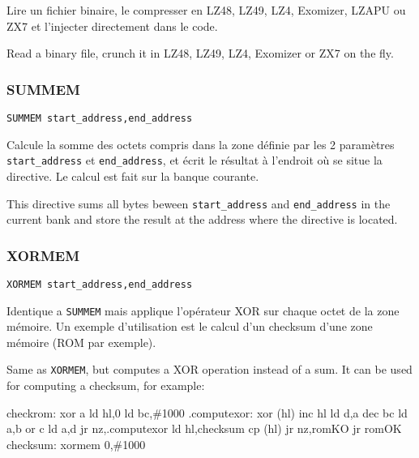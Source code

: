 \begin{xfr}
Lire un fichier binaire, le compresser en LZ48, LZ49, LZ4, Exomizer, LZAPU  ou ZX7 et l'injecter directement dans le code.
\end{xfr}

\begin{xen}
Read a binary file, crunch it in LZ48, LZ49, LZ4, Exomizer or ZX7 on the fly.
\end{xen}


\subsubsection{SUMMEM}
\begin{verbatim}
SUMMEM start_address,end_address
\end{verbatim}
\begin{xfr}
  Calcule la somme des octets compris dans la zone définie par les 2 paramètres
  \texttt{start\_address} et \texttt{end\_address},
  et écrit le résultat à l'endroit où se situe la directive.
  Le calcul est fait sur la banque courante.
\end{xfr}

\begin{xen}
This directive sums all bytes beween \texttt{start\_address} and \texttt{end\_address} in the current bank
and store the result at the address where the directive is located.
\end{xen}


\subsubsection{XORMEM}
\begin{verbatim}
XORMEM start_address,end_address
\end{verbatim}

\begin{xfr}
  Identique a \texttt{SUMMEM} mais applique l'opérateur XOR sur chaque octet de la zone mémoire.
  Un exemple d'utilisation est le calcul d'un checksum d'une zone mémoire (ROM par exemple).
\end{xfr}

\begin{xen}
Same as \texttt{XORMEM}, but computes a XOR operation instead of a sum.
It can be used for computing a checksum, for example:
\end{xen}


\begin{code}
checkrom:
  xor a
  ld hl,0
  ld bc,\#1000
.computexor:
  xor (hl)
  inc hl
  ld d,a
  dec bc
  ld a,b
  or c
  ld a,d
  jr nz,.computexor
  ld hl,checksum
  cp (hl)
  jr nz,romKO
  jr romOK
checksum:
   xormem 0,\#1000
\end{code}
